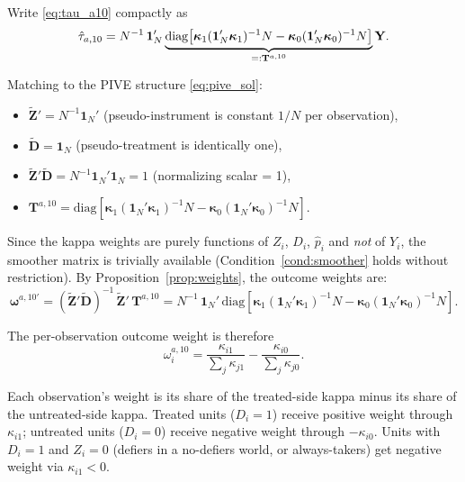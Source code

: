 \documentclass[12pt, a4paper]{article}
\theoremstyle{condstyle}
\theoremstyle{plain}
\newcommand{\bone}{\mathbf{1}_N}
\newcommand{\that}[1]{\hat{\tau}_{#1}}
\newcommand{\phat}{\hat{p}}
\begin{document}
Write \eqref{eq:tau_a10} compactly as
\begin{equation}
  \that{a,10}
  = N^{-1}\,\bone'\underbrace{%
    \mathrm{diag}\!\left[\boldsymbol{\kappa}_1(\bone'\boldsymbol{\kappa}_1)^{-1}N
                        - \boldsymbol{\kappa}_0(\bone'\boldsymbol{\kappa}_0)^{-1}N\right]
    }_{=:\mathbf{T}^{a,10}}\mathbf{Y}.
  \label{eq:ta10_compact}
\end{equation}

Matching to the PIVE structure \eqref{eq:pive_sol}:
\begin{itemize}
  \item $\tilde{\mathbf{Z}}' = N^{-1}\bone'$ \quad (pseudo-instrument is constant $1/N$ per observation),
  \item $\tilde{\mathbf{D}} = \bone$ \quad (pseudo-treatment is identically one),
  \item $\tilde{\mathbf{Z}}'\tilde{\mathbf{D}} = N^{-1}\bone'\bone = 1$ \quad (normalizing scalar = 1),
  \item $\mathbf{T}^{a,10} = \mathrm{diag}\!\left[\boldsymbol{\kappa}_1(\bone'\boldsymbol{\kappa}_1)^{-1}N
          - \boldsymbol{\kappa}_0(\bone'\boldsymbol{\kappa}_0)^{-1}N\right]$.
\end{itemize}

\noindent Since the kappa weights are purely functions of $Z_i$, $D_i$, $\phat_i$
and \emph{not} of $Y_i$, the smoother matrix is trivially available
(Condition~\ref{cond:smoother} holds without restriction).
By Proposition~\ref{prop:weights}, the outcome weights are:
\begin{equation}
  \boldsymbol{\omega}^{a,10\prime}
  = (\tilde{\mathbf{Z}}'\tilde{\mathbf{D}})^{-1}\,\tilde{\mathbf{Z}}'\,\mathbf{T}^{a,10}
  = N^{-1}\,\bone'\,\mathrm{diag}\!\left[
      \boldsymbol{\kappa}_1(\bone'\boldsymbol{\kappa}_1)^{-1}N
      - \boldsymbol{\kappa}_0(\bone'\boldsymbol{\kappa}_0)^{-1}N
    \right].
  \label{eq:w_a10}
\end{equation}

\noindent The per-observation outcome weight is therefore
\begin{equation}
  \boxed{
    \omega_i^{a,10}
    = \frac{\kappa_{i1}}{\sum_j \kappa_{j1}}
    - \frac{\kappa_{i0}}{\sum_j \kappa_{j0}}.
  }
  \label{eq:w_a10_scalar}
\end{equation}

\begin{notebox}[Interpretation]
Each observation's weight is its share of the treated-side kappa
minus its share of the untreated-side kappa.
Treated units ($D_i=1$) receive positive weight through $\kappa_{i1}$;
untreated units ($D_i=0$) receive negative weight through $-\kappa_{i0}$.
Units with $D_i=1$ and $Z_i=0$ (defiers in a no-defiers world, or always-takers)
get negative weight via $\kappa_{i1}<0$.
\end{notebox}
\end{document}
